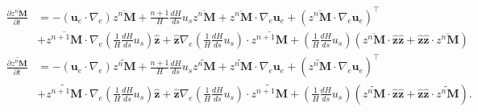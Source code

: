 \begin{equation}\label{eqn:induction-int-tensor-full}
\begin{aligned}
    \frac{\partial \overline{z^n \mathbf{M}}}{\partial t} &= - (\mathbf{u}_e\cdot \nabla_e) \overline{z^n \mathbf{M}} + \frac{n+1}{H}\frac{dH}{ds} u_s \overline{z^n \mathbf{M}} + \overline{z^n \mathbf{M}}\cdot \nabla_e \mathbf{u}_e + \left(\overline{z^n \mathbf{M}}\cdot \nabla_e \mathbf{u}_e\right)^\top \\
    &+ \overline{z^{n+1} \mathbf{M}}\cdot \nabla_e \left(\frac{1}{H}\frac{dH}{ds}u_s\right) \hat{\mathbf{z}} + \hat{\mathbf{z}} \nabla_e \left(\frac{1}{H}\frac{dH}{ds}u_s\right) \cdot \overline{z^{n+1} \mathbf{M}} + \left(\frac{1}{H}\frac{dH}{ds}u_s\right) \left(\overline{z^n \mathbf{M}}\cdot \hat{\mathbf{z}} \hat{\mathbf{z}} + \hat{\mathbf{z}}\hat{\mathbf{z}}\cdot \overline{z^n \mathbf{M}}\right) \\ 
    \frac{\partial \widetilde{z^n \mathbf{M}}}{\partial t} &= - (\mathbf{u}_e\cdot \nabla_e) \widetilde{z^n \mathbf{M}} + \frac{n+1}{H}\frac{dH}{ds} u_s \widetilde{z^n \mathbf{M}} + \widetilde{z^n \mathbf{M}}\cdot \nabla_e \mathbf{u}_e + \left(\widetilde{z^n \mathbf{M}}\cdot \nabla_e \mathbf{u}_e\right)^\top \\
    &+ \widetilde{z^{n+1} \mathbf{M}}\cdot \nabla_e \left(\frac{1}{H}\frac{dH}{ds}u_s\right) \hat{\mathbf{z}} + \hat{\mathbf{z}} \nabla_e \left(\frac{1}{H}\frac{dH}{ds}u_s\right) \cdot \widetilde{z^{n+1} \mathbf{M}} + \left(\frac{1}{H}\frac{dH}{ds}u_s\right) \left(\widetilde{z^n \mathbf{M}}\cdot \hat{\mathbf{z}} \hat{\mathbf{z}} + \hat{\mathbf{z}}\hat{\mathbf{z}}\cdot \widetilde{z^n \mathbf{M}}\right).
\end{aligned}
\end{equation}
